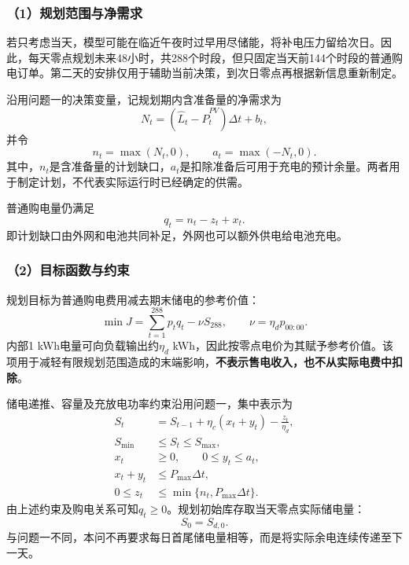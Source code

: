 \subsubsection*{（1）规划范围与净需求}

若只考虑当天，模型可能在临近午夜时过早用尽储能，将补电压力留给次日。因此，每天零点规划未来48小时，共288个时段，但只固定当天前144个时段的普通购电订单。第二天的安排仅用于辅助当前决策，到次日零点再根据新信息重新制定。

沿用问题一的决策变量，记规划期内含准备量的净需求为
\begin{equation}
N_t=\left(\widehat L_t-\widehat P^{PV}_t\right)\Delta t+b_t,
\label{eq:q2_net_demand}
\end{equation}
并令
\[
n_t=\max(N_t,0),\qquad a_t=\max(-N_t,0).
\]
其中，$n_t$是含准备量的计划缺口，$a_t$是扣除准备后可用于充电的预计余量。两者用于制定计划，不代表实际运行时已经确定的供需。

普通购电量仍满足
\begin{equation}
q_t=n_t-z_t+x_t.
\label{eq:q2_purchase}
\end{equation}
即计划缺口由外网和电池共同补足，外网也可以额外供电给电池充电。

\subsubsection*{（2）目标函数与约束}

规划目标为普通购电费用减去期末储电的参考价值：
\begin{equation}
\min J=\sum_{t=1}^{288}p_tq_t-\nu S_{288},\qquad \nu=\eta_d p_{00:00}.
\label{eq:q2_objective}
\end{equation}
内部1 kWh电量可向负载输出约$\eta_d$ kWh，因此按零点电价为其赋予参考价值。该项用于减轻有限规划范围造成的末端影响，\textbf{不表示售电收入，也不从实际电费中扣除}。

储电递推、容量及充放电功率约束沿用问题一，集中表示为
\begin{equation}
\begin{aligned}
S_t&=S_{t-1}+\eta_c(x_t+y_t)-\frac{z_t}{\eta_d},\\
S_{\min}&\le S_t\le S_{\max},\\
x_t&\ge0,\qquad 0\le y_t\le a_t,\\
x_t+y_t&\le P_{\max}\Delta t,\\
0\le z_t&\le\min\{n_t,P_{\max}\Delta t\}.
\end{aligned}
\label{eq:q2_constraints}
\end{equation}
由上述约束及购电关系可知$q_t\ge0$。规划初始库存取当天零点实际储电量：
\begin{equation}
S_0=S_{d,0}.
\label{eq:q2_initial_soc}
\end{equation}
与问题一不同，本问不再要求每日首尾储电量相等，而是将实际余电连续传递至下一天。

